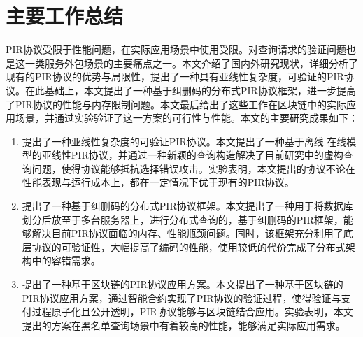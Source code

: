 \section{主要工作总结}
PIR协议受限于性能问题，在实际应用场景中使用受限。对查询请求的验证问题也是这一类服务外包场景的主要痛点之一。本文介绍了国内外研究现状，详细分析了现有的PIR协议的优势与局限性，提出了一种具有亚线性复杂度，可验证的PIR协议。在此基础上，本文提出了一种基于纠删码的分布式PIR协议框架，进一步提高了PIR协议的性能与内存限制问题。本文最后给出了这些工作在区块链中的实际应用场景，并通过实验验证了这一方案的可行性与性能。本文的主要研究成果如下：
\begin{enumerate}
    \item 提出了一种亚线性复杂度的可验证PIR协议。本文提出了一种基于离线-在线模型的亚线性PIR协议，并通过一种新颖的查询构造解决了目前研究中的虚构查询问题，使得协议能够抵抗选择错误攻击。实验表明，本文提出的协议不论在性能表现与运行成本上，都在一定情况下优于现有的PIR协议。
    \item 提出了一种基于纠删码的分布式PIR协议框架。本文提出了一种用于将数据库划分后放至于多台服务器上，进行分布式查询的，基于纠删码的PIR框架，能够解决目前PIR协议面临的内存、性能瓶颈问题。同时，该框架充分利用了底层协议的可验证性，大幅提高了编码的性能，使用较低的代价完成了分布式架构中的容错需求。
    \item 提出了一种基于区块链的PIR协议应用方案。本文提出了一种基于区块链的PIR协议应用方案，通过智能合约实现了PIR协议的验证过程，使得验证与支付过程原子化且公开透明，PIR协议能够与区块链结合应用。实验表明，本文提出的方案在黑名单查询场景中有着较高的性能，能够满足实际应用需求。
\end{enumerate}